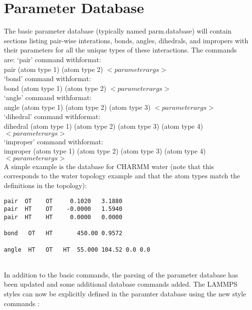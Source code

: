 \documentclass[12pt,letterpaper,]{article}
\begin{document}
\section{Parameter Database}
The basic parameter database (typically named parm.database) will contain sections listing pair-wise interations, bonds, angles, dihedrals, and impropers with their parameters for all the unique types of these interactions. The commands are:
 `pair' command withformat:\\
pair (atom type 1) (atom type 2) $<parameter args>$
\\
 `bond' command withformat:\\
bond (atom type 1) (atom type 2) $<parameter args>$
\\
 `angle' command withformat:\\
angle (atom type 1) (atom type 2) (atom type 3) $<parameter args>$
\\
 `dihedral' command withformat:\\
dihedral (atom type 1) (atom type 2) (atom type 3)  (atom type 4) $<parameter args>$
\\
 `improper' command withformat:\\
improper (atom type 1) (atom type 2) (atom type 3)  (atom type 4) $<parameter args>$
\\
A simple example is the database for CHARMM water (note that this corresponds to the water topology example and that the atom types match the definitions in the topology):
\begin{verbatim}
pair  OT    OT     0.1020   3.1880  
pair  HT    OT    -0.0000   1.5940
pair  HT    HT     0.0000   0.0000

bond   OT   HT       450.00 0.9572

angle  HT   OT   HT  55.000 104.52 0.0 0.0
\end{verbatim}
\\
In addition to the basic commands, the parsing of the parameter database has been updated and some additional database commands added.
The LAMMPS styles can now be explicitly defined in the paramter database using the new style commands :\\
\end{document}
